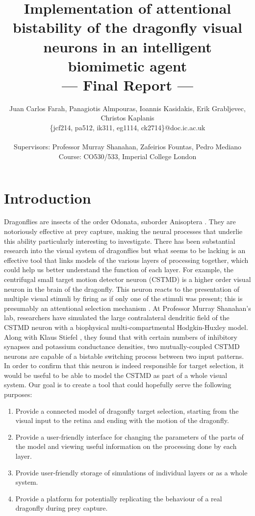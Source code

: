 \documentclass[a4paper,11pt]{article}
\title{Implementation of attentional bistability of the dragonfly visual neurons in an intelligent biomimetic agent\\\Large{--- Final Report ---}}
\author{Juan Carlos Farah, Panagiotis Almpouras, Ioannis Kasidakis, Erik Grabljevec, Christos Kaplanis\\
       \{jcf214, pa512, ik311, eg1114, ck2714\}@doc.ic.ac.uk\\ \\
       \small{Supervisors: Professor Murray Shanahan, Zafeirios Fountas, Pedro Mediano}\\
       \small{Course: CO530/533, Imperial College London}
}
\begin{document}
\maketitle

\section{Introduction}

Dragonflies are insects of the order Odonata, suborder Anisoptera \cite{dfwiki}. They are notoriously effective at prey capture, making the neural processes that underlie this ability particularly interesting to investigate. There has been substantial research into the visual system of dragonflies but what seems to be lacking is an effective tool that links models of the various layers of processing together, which could help us better understand the function of each layer. For example, the centrifugal small target motion detector neuron (CSTMD) is a higher order visual neuron in the brain of the dragonfly. This neuron reacts to the presentation of multiple visual stimuli by firing as if only one of the stimuli was present; this is presumably an attentional selection mechanism \cite{w13}. At Professor Murray Shanahan's lab, researchers have simulated the large contralateral dendritic field of the CSTMD neuron with a biophysical multi-compartmental Hodgkin-Huxley model. Along with Klaus Stiefel \cite{ne13}, they found that with certain numbers of inhibitory synapses and potassium conductance densities, two mutually-coupled CSTMD neurons are capable of a bistable switching process between two input patterns. In order to confirm that this neuron is indeed responsible for target selection, it would be useful to be able to model the CSTMD as part of a whole visual system. Our goal is to create a tool that could hopefully serve the following purposes:
\begin{enumerate}
\item Provide a connected model of dragonfly target selection, starting from the visual input to the retina and ending with the motion of the dragonfly.
\item Provide a user-friendly interface for changing the parameters of the parts of the model and viewing useful information on the processing done by each layer.
\item Provide user-friendly storage of simulations of individual layers or as a whole system.
\item Provide a platform for potentially replicating the behaviour of a real dragonfly during prey capture.
\end{enumerate}
\end{document}
